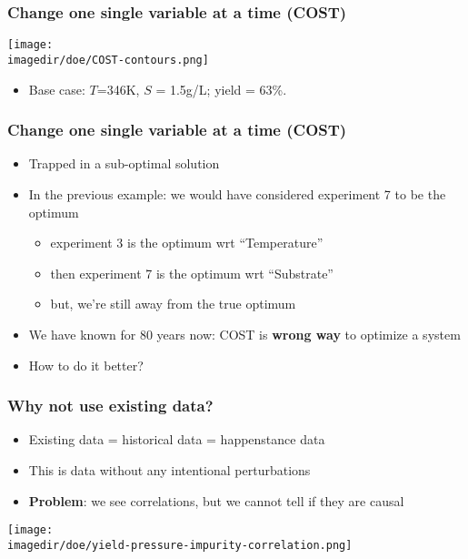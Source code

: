 \begin{frame}\frametitle{Change one single variable at a time (COST)}
	\begin{center}
		\texttt{[image: \\imagedir/doe/COST-contours.png]}
	\end{center}
	\begin{itemize}
		\item	Base case: $T$=346K, $S$ = 1.5g/L; yield = 63\%.
	\end{itemize}
\end{frame}

\begin{frame}\frametitle{Change one single variable at a time (COST)}
	\begin{itemize}
		\item	Trapped in a sub-optimal solution
		\item	In the previous example: we would have considered experiment 7 to be the optimum
			\begin{itemize}
				\item	experiment 3 is the optimum wrt ``Temperature''
				\item	then experiment 7 is the optimum wrt ``Substrate''
				\item	but, we're still away from the true optimum
			\end{itemize}
		\item	We have known for 80 years now: COST is \textbf{wrong way} to optimize a system
		\item	How to do it better?
	\end{itemize}
\end{frame}

\begin{frame}\frametitle{Why not use existing data?}
	\begin{itemize}
		\item	Existing data = historical data = happenstance data
		\item	This is data without any intentional perturbations
		\item	\textbf{Problem}: we see correlations, but we cannot tell if they are causal
	\end{itemize}
	\texttt{[image: \\imagedir/doe/yield-pressure-impurity-correlation.png]}
\end{frame}

